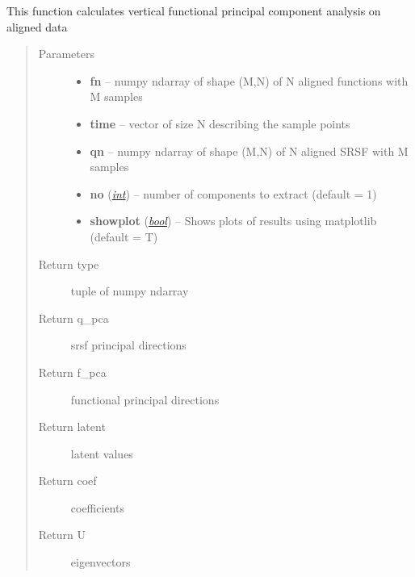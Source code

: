 \documentclass[letterpaper,10pt,english]{sphinxmanual}
\begin{document}
\begin{fulllineitems}
\label{fPCA:fPCA.vertfPCA}
This function calculates vertical functional principal component analysis
on aligned data
\begin{quote}\begin{description}
\item[{Parameters}] \leavevmode\begin{itemize}
\item {} 
\textbf{fn} -- numpy ndarray of shape (M,N) of N aligned functions with M
samples

\item {} 
\textbf{time} -- vector of size N describing the sample points

\item {} 
\textbf{qn} -- numpy ndarray of shape (M,N) of N aligned SRSF with M samples

\item {} 
\textbf{no} (\href{http://docs.python.org/library/functions.html\#int}{\emph{int}}) -- number of components to extract (default = 1)

\item {} 
\textbf{showplot} (\href{http://docs.python.org/library/functions.html\#bool}{\emph{bool}}) -- Shows plots of results using matplotlib (default = T)

\end{itemize}

\item[{Return type}] \leavevmode
tuple of numpy ndarray

\item[{Return q\_pca}] \leavevmode
srsf principal directions

\item[{Return f\_pca}] \leavevmode
functional principal directions

\item[{Return latent}] \leavevmode
latent values

\item[{Return coef}] \leavevmode
coefficients

\item[{Return U}] \leavevmode
eigenvectors

\end{description}\end{quote}

\end{fulllineitems}
\end{document}
